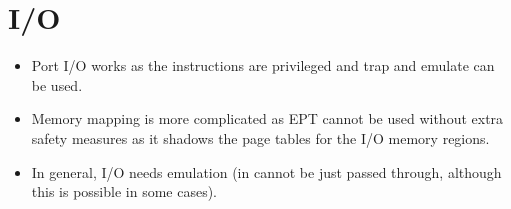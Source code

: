 \documentclass[a4paper, 11pt, accentcolor = tud3b]{tudreport}
\begin{document}
        \section{I/O}
            \begin{itemize}
            	\item Port I/O works as the instructions are privileged and trap and emulate can be used.
            	\item Memory mapping is more complicated as EPT cannot be used without extra safety measures as it shadows the page tables for the I/O memory regions.
            	\item In general, I/O needs emulation (in cannot be just passed through, although this is possible in some cases).
            \end{itemize}
        
\end{document}
